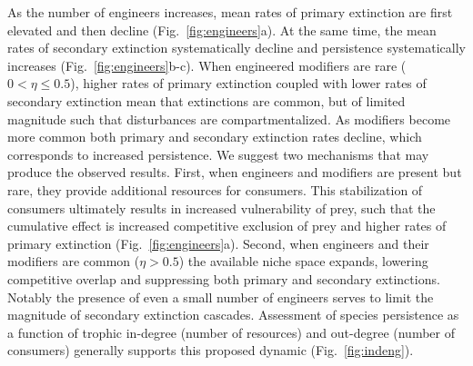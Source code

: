 \documentclass[twocolumn,preprintnumbers,amsmath,amssymb,superscriptaddress,linenumbers]{revtex4-1}
\begin{document}
As the number of engineers increases, mean rates of primary extinction are first elevated and then decline (Fig.\ \ref{fig:engineers}a).
At the same time, the mean rates of secondary extinction systematically decline and persistence systematically increases (Fig.\ \ref{fig:engineers}b-c).
When engineered modifiers are rare ($0 < \eta \leq 0.5$), higher rates of primary extinction coupled with lower rates of secondary extinction mean that extinctions are common, but of limited magnitude such that disturbances are compartmentalized.
As modifiers become more common both primary and secondary extinction rates decline, which corresponds to increased persistence.
We suggest two mechanisms that may produce the observed results.
First, when engineers and modifiers are present but rare, they provide additional resources for consumers.
This stabilization of consumers ultimately results in increased vulnerability of prey, such that the cumulative effect is increased competitive exclusion of prey and higher rates of primary extinction (Fig.\ \ref{fig:engineers}a).
Second, when engineers and their modifiers are common ($\eta > 0.5$) the available niche space expands, lowering competitive overlap and suppressing both primary and secondary extinctions.
Notably the presence of even a small number of engineers serves to limit the magnitude of secondary extinction cascades.
Assessment of species persistence as a function of trophic in-degree (number of resources) and out-degree (number of consumers) generally supports this proposed dynamic (Fig.\ \ref{fig:indeng}).

\end{document}
